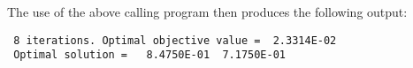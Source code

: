 \documentclass{galahad}
\begin{document}
\noindent
The use of the above calling program then produces the following output:

\def\baselinestretch{0.8}{\tt \begin{verbatim}
 8 iterations. Optimal objective value =  2.3314E-02
 Optimal solution =   8.4750E-01  7.1750E-01
\end{verbatim} }\def\baselinestretch{1.0}
\end{document}
